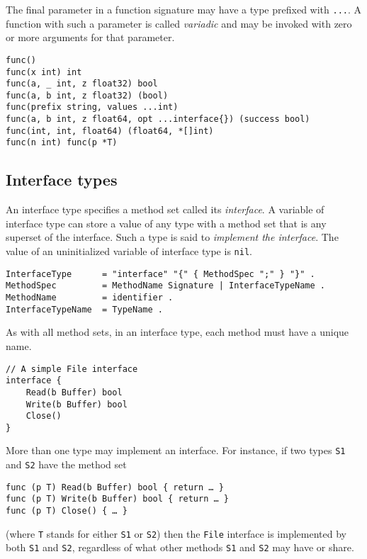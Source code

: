 {The final parameter in a function signature may have a type prefixed
with \texttt{...}. A function with such a parameter is called
\emph{variadic} and may be invoked with zero or more arguments for that
parameter.

\begin{Verbatim}[frame=single]
func()
func(x int) int
func(a, _ int, z float32) bool
func(a, b int, z float32) (bool)
func(prefix string, values ...int)
func(a, b int, z float64, opt ...interface{}) (success bool)
func(int, int, float64) (float64, *[]int)
func(n int) func(p *T)
\end{Verbatim}

\subsection*{Interface types}

An interface type specifies a method set called
its \emph{interface}. A variable of interface type can store a value of
any type with a method set that is any superset of the interface. Such a
type is said to \emph{implement the interface}. The value of an
uninitialized variable of interface type is \texttt{nil}.

\begin{Verbatim}[frame=single]
InterfaceType      = "interface" "{" { MethodSpec ";" } "}" .
MethodSpec         = MethodName Signature | InterfaceTypeName .
MethodName         = identifier .
InterfaceTypeName  = TypeName .
\end{Verbatim}

As with all method sets, in an interface type, each method must have a
unique name.

\begin{Verbatim}[frame=single]
// A simple File interface
interface {
    Read(b Buffer) bool
    Write(b Buffer) bool
    Close()
}
\end{Verbatim}

More than one type may implement an interface. For instance, if two
types \texttt{S1} and \texttt{S2} have the method set

\begin{Verbatim}[frame=single]
func (p T) Read(b Buffer) bool { return … }
func (p T) Write(b Buffer) bool { return … }
func (p T) Close() { … }
\end{Verbatim}

(where \texttt{T} stands for either \texttt{S1} or \texttt{S2}) then the
\texttt{File} interface is implemented by both \texttt{S1} and
\texttt{S2}, regardless of what other methods \texttt{S1} and
\texttt{S2} may have or share.

}
